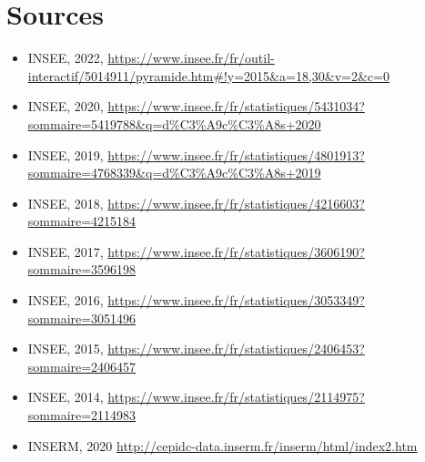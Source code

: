 \documentclass[titlepage]{article}
\begin{document}




\section*{Sources} 
\label{source}

\begin{itemize}
\item INSEE, 2022, \url{https://www.insee.fr/fr/outil-interactif/5014911/pyramide.htm#!y=2015&a=18,30&v=2&c=0}

\item INSEE, 2020, \url{https://www.insee.fr/fr/statistiques/5431034?sommaire=5419788&q=d\%C3\%A9c\%C3\%A8s+2020}
\item INSEE, 2019, \url{https://www.insee.fr/fr/statistiques/4801913?sommaire=4768339&q=d\%C3\%A9c\%C3\%A8s+2019}
\item INSEE, 2018, \url{https://www.insee.fr/fr/statistiques/4216603?sommaire=4215184}
\item INSEE, 2017, \url{https://www.insee.fr/fr/statistiques/3606190?sommaire=3596198}
\item INSEE, 2016, \url{https://www.insee.fr/fr/statistiques/3053349?sommaire=3051496}
\item INSEE, 2015, \url{https://www.insee.fr/fr/statistiques/2406453?sommaire=2406457}
\item INSEE, 2014, \url{https://www.insee.fr/fr/statistiques/2114975?sommaire=2114983}

\item INSERM, 2020 \url{http://cepidc-data.inserm.fr/inserm/html/index2.htm}
\end{itemize}

\printbibliography
\end{document}
